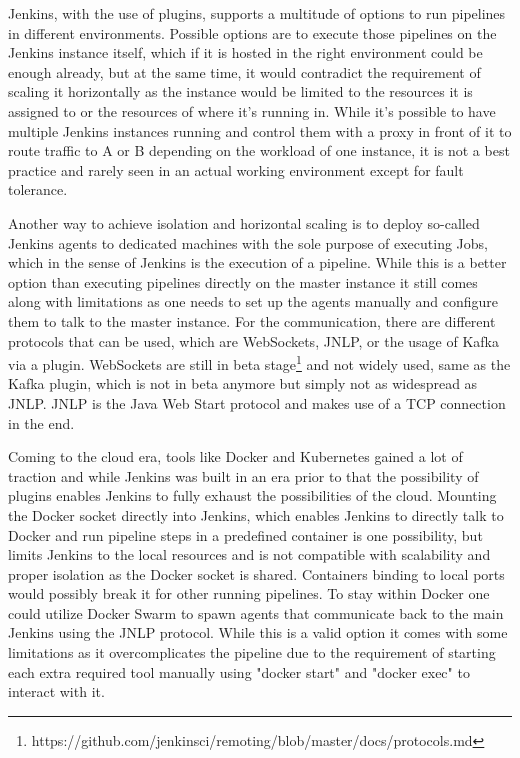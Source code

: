Jenkins, with the use of plugins, supports a multitude of options to run pipelines in different environments.
Possible options are to execute those pipelines on the Jenkins instance itself, which if it is hosted in the right environment could be enough already, but at the same time, it would contradict the requirement of scaling it horizontally as the instance would be limited to the resources it is assigned to or the resources of where it's running in. While it's possible to have multiple Jenkins instances running and control them with a proxy in front of it to route traffic to A or B depending on the workload of one instance, it is not a best practice and rarely seen in an actual working environment except for fault tolerance.

Another way to achieve isolation and horizontal scaling is to deploy so-called Jenkins agents to dedicated machines with the sole purpose of executing Jobs, which in the sense of Jenkins is the execution of a pipeline. While this is a better option than executing pipelines directly on the master instance it still comes along with limitations as one needs to set up the agents manually and configure them to talk to the master instance. For the communication, there are different protocols that can be used, which are WebSockets, JNLP, or the usage of Kafka via a plugin. WebSockets are still in beta stage\footnote{https://github.com/jenkinsci/remoting/blob/master/docs/protocols.md} and not widely used, same as the Kafka plugin, which is not in beta anymore but simply not as widespread as JNLP. JNLP is the Java Web Start protocol and makes use of a TCP connection in the end.

Coming to the cloud era, tools like Docker and Kubernetes gained a lot of traction and while Jenkins was built in an era prior to that the possibility of plugins enables Jenkins to fully exhaust the possibilities of the cloud.
Mounting the Docker socket directly into Jenkins, which enables Jenkins to directly talk to Docker and run pipeline steps in a predefined container is one possibility, but limits Jenkins to the local resources and is not compatible with scalability and proper isolation as the Docker socket is shared. Containers binding to local ports would possibly break it for other running pipelines. To stay within Docker one could utilize Docker Swarm to spawn agents that communicate back to the main Jenkins using the JNLP protocol. While this is a valid option it comes with some limitations as it overcomplicates the pipeline due to the requirement of starting each extra required tool manually using "docker start" and "docker exec" to interact with it.

